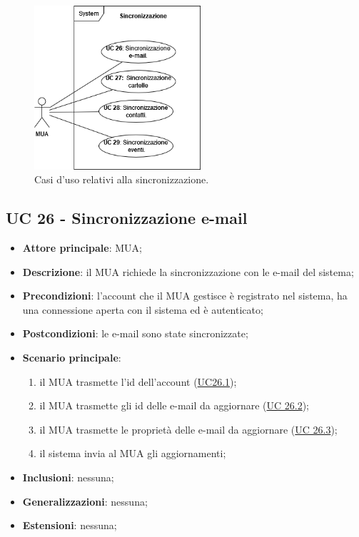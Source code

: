 
\begin{figure}[H]
    \includegraphics[width=0.55\textwidth]{sections/uc_imgs/UC-sincronizzazione.png}
    \centering
    \caption{Casi d'uso relativi alla sincronizzazione.}
\end{figure}

\subsection{UC 26 - Sincronizzazione e-mail} \label{sec:UC26}
    
    \begin{itemize}
        \item \textbf{Attore principale}: MUA;
        \item \textbf{Descrizione}: il MUA richiede la sincronizzazione con le e-mail del sistema;
        \item \textbf{Precondizioni}: l’account che il MUA gestisce è registrato nel sistema, ha una connessione aperta con il sistema ed è autenticato;
        \item \textbf{Postcondizioni}: le e-mail sono state sincronizzate;
        \item \textbf{Scenario principale}:
            \begin{enumerate}
                \item il MUA trasmette l'id dell'account (\hyperref[sec:UC26.1]{UC26.1});
                \item il MUA trasmette gli id delle e-mail da aggiornare (\hyperref[sec:UC26.2]{UC 26.2});
                \item il MUA trasmette le proprietà delle e-mail da aggiornare (\hyperref[sec:UC26.3]{UC 26.3});
                \item il sistema invia al MUA gli aggiornamenti;
            \end{enumerate}
        \item \textbf{Inclusioni}: nessuna;
        \item \textbf{Generalizzazioni}: nessuna;
        \item \textbf{Estensioni}: nessuna;
    \end{itemize}

